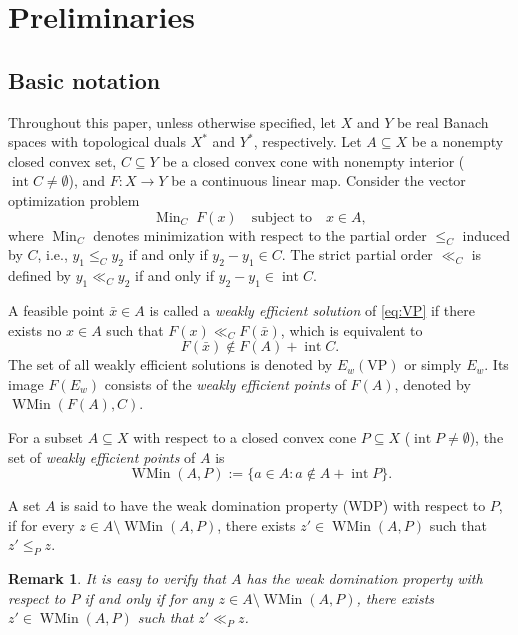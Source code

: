 \documentclass[11pt]{article}
\DeclareMathOperator{\intr}{int}
\newtheorem{remark}{Remark}[section]
\begin{document}
  
 

\section{Preliminaries}
\subsection{Basic notation}

Throughout this paper, unless otherwise specified,
let $X$ and $Y$ be real Banach spaces with topological duals $X^*$ and $Y^*$, respectively.  Let $A \subseteq X$ be a nonempty closed convex set, $C \subseteq Y$ be a closed convex cone with nonempty interior ($\intr C \neq \emptyset$), and $F: X \to Y$ be a continuous linear map. Consider the vector optimization problem
\begin{equation}\label{eq:VP}
	\operatorname{Min}_C \; F(x) \quad \text{subject to} \quad x \in A,
\end{equation}
where $\operatorname{Min}_C$ denotes minimization with respect to the partial order $\leq_C$ induced by $C$, i.e., $y_1 \leq_C y_2$ if and only if $y_2 - y_1 \in C$. The strict partial order $\ll_C$ is defined by $y_1 \ll_C y_2$ if and only if $y_2 - y_1 \in \intr C$.

A feasible point $\bar{x} \in A$ is called a \emph{weakly efficient solution} of \eqref{eq:VP} if there exists no $x \in A$ such that $F(x) \ll_C F(\bar{x})$, which is equivalent to
\[
F(\bar{x}) \notin F(A) + \intr C.
\]
The set of all weakly efficient solutions is denoted by $E_w(\text{VP})$ or simply $E_w$. Its image $F(E_w)$ consists of the \emph{weakly efficient points} of $F(A)$, denoted by $\operatorname{WMin}(F(A), C)$.  


For a subset $A \subseteq X$ with respect to a closed convex cone $P \subseteq X$ ($\intr P \neq \emptyset$), the set of \emph{weakly efficient points} of $A$ is
\[
\operatorname{WMin}(A, P) := \{a \in A : a \notin A + \intr P\}.
\]




A set $A$ is said to have the  weak domination property  (WDP) with respect to $P$, if for every $z \in A \setminus \operatorname{WMin}(A, P)$, there exists $z' \in \operatorname{WMin}(A, P)$ such that $z' \leq_P z$.

\begin{remark} \label{RngXEQ}     It is easy to verify that  $A$ has  the  weak domination property with respect to $P$ if and only if for any $z \in A \setminus \operatorname{WMin}(A, P)$, there exists $z' \in \operatorname{WMin}(A, P)$ such that $z'  \ll_P  z$.
\end{remark}
\end{document}
